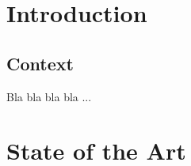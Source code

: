 \documentclass{paper}
\begin{document}
\section{Introduction}
\subsection{Context}
Bla bla bla bla ...

\section{State of the Art}
\end{document}
